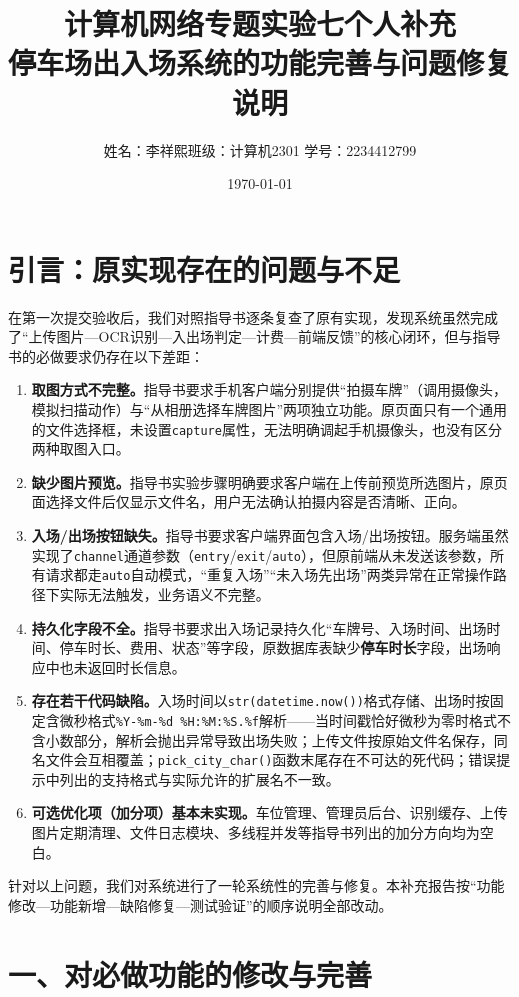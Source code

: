 \documentclass[12pt,a4paper]{article}
\title{计算机网络专题实验七个人补充\\\large 停车场出入场系统的功能完善与问题修复说明}
\author{姓名：李祥熙\quad 班级：计算机2301 \quad 学号：2234412799}
\date{\today}
\begin{document}
\maketitle

\section*{引言：原实现存在的问题与不足}
在第一次提交验收后，我们对照指导书逐条复查了原有实现，发现系统虽然完成了“上传图片—OCR识别—入出场判定—计费—前端反馈”的核心闭环，但与指导书的必做要求仍存在以下差距：

\begin{enumerate}
  \item \textbf{取图方式不完整。}指导书要求手机客户端分别提供“拍摄车牌”（调用摄像头，模拟扫描动作）与“从相册选择车牌图片”两项独立功能。原页面只有一个通用的文件选择框，未设置\texttt{capture}属性，无法明确调起手机摄像头，也没有区分两种取图入口。
  \item \textbf{缺少图片预览。}指导书实验步骤明确要求客户端在上传前预览所选图片，原页面选择文件后仅显示文件名，用户无法确认拍摄内容是否清晰、正向。
  \item \textbf{入场/出场按钮缺失。}指导书要求客户端界面包含入场/出场按钮。服务端虽然实现了\texttt{channel}通道参数（\texttt{entry}/\texttt{exit}/\texttt{auto}），但原前端从未发送该参数，所有请求都走\texttt{auto}自动模式，“重复入场”“未入场先出场”两类异常在正常操作路径下实际无法触发，业务语义不完整。
  \item \textbf{持久化字段不全。}指导书要求出入场记录持久化“车牌号、入场时间、出场时间、停车时长、费用、状态”等字段，原数据库表缺少\textbf{停车时长}字段，出场响应中也未返回时长信息。
  \item \textbf{存在若干代码缺陷。}入场时间以\texttt{str(datetime.now())}格式存储、出场时按固定含微秒格式\texttt{\%Y-\%m-\%d \%H:\%M:\%S.\%f}解析——当时间戳恰好微秒为零时格式不含小数部分，解析会抛出异常导致出场失败；上传文件按原始文件名保存，同名文件会互相覆盖；\texttt{pick\_city\_char()}函数末尾存在不可达的死代码；错误提示中列出的支持格式与实际允许的扩展名不一致。
  \item \textbf{可选优化项（加分项）基本未实现。}车位管理、管理员后台、识别缓存、上传图片定期清理、文件日志模块、多线程并发等指导书列出的加分方向均为空白。
\end{enumerate}

针对以上问题，我们对系统进行了一轮系统性的完善与修复。本补充报告按“功能修改—功能新增—缺陷修复—测试验证”的顺序说明全部改动。

\section*{一、对必做功能的修改与完善}
\end{document}
